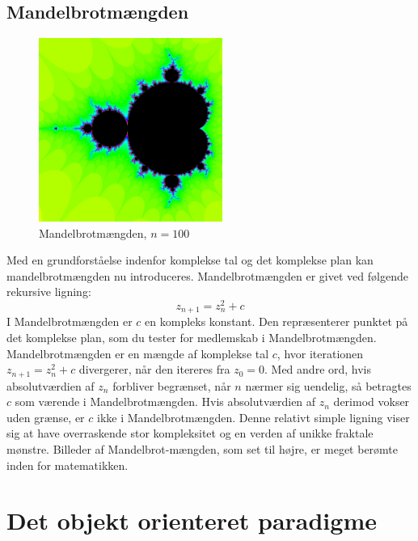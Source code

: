 \documentclass{article}
\begin{document}
\subsection{Mandelbrotmængden}
\begin{figure}
\includegraphics[width=6cm]{madelbrotcolor.png}
\caption{Mandelbrotmængden, $n=100$}\label{wrap-fig:6}
\end{figure} 
Med en grundforståelse indenfor komplekse tal og det komplekse plan kan mandelbrotmængden nu introduceres. Mandelbrotmængden er givet ved følgende rekursive ligning:
$$
z_{n+1}=z_n^2+c
$$
I Mandelbrotmængden er \( c \) en kompleks konstant. Den repræsenterer punktet på det komplekse plan, som du tester for medlemskab i Mandelbrotmængden. Mandelbrotmængden er en mængde af komplekse tal \( c \), hvor iterationen \( z_{n+1} = z_{n}^2 + c \) divergerer, når den itereres fra \( z_0 = 0 \). Med andre ord, hvis absolutværdien af \( z_{n} \) forbliver begrænset, når \( n \) nærmer sig uendelig, så betragtes \( c \) som værende i Mandelbrotmængden. Hvis absolutværdien af \( z_{n} \) derimod vokser uden grænse, er \( c \) ikke i Mandelbrotmængden. Denne relativt simple ligning viser sig at have overraskende stor kompleksitet og en verden af unikke fraktale mønstre. Billeder af Mandelbrot-mængden, som set til højre, er meget berømte inden for matematikken. \parencite{Videnskab_2023}
\section{Det objekt orienteret paradigme}
\end{document}
